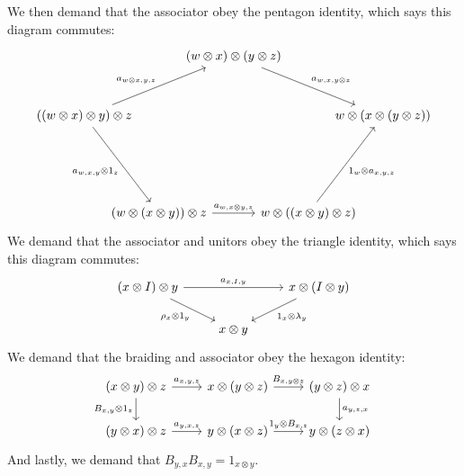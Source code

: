 \documentclass[TFM.tex]{subfiles}
\begin{document}
\begin{defi}
We then demand that the associator obey the pentagon identity, which says this diagram commutes:
\[
\begin{tikzcd}[column sep=-25, row sep=30]
                                                                                                            &                                                                     & (w\otimes x)\otimes (y\otimes z) \arrow[rrd, "{a_{w,x,y\otimes z}}"] &                                                                         &                                \\
((w\otimes x)\otimes y)\otimes z \arrow[rru, "{a_{w\otimes x,y,z}}"] \arrow[rdd, "{a_{w,x,y}\otimes 1_z}"'] &                                                                     &                                                                      &                                                                         & w\otimes(x\otimes(y\otimes z)) \\
                                                                                                            &                                                                     &                                                                      &                                                                         &                                \\
                                                                                                            & (w\otimes (x\otimes y))\otimes z \arrow[rr, "{a_{w,x\otimes y,z}}"] &                                                                      & w\otimes ((x\otimes y)\otimes z) \arrow[ruu, "{1_w\otimes a_{x,y,z}}"'] &                               
\end{tikzcd}
\]
We demand that the associator and unitors obey the triangle identity, which says this diagram commutes:
\[
\begin{tikzcd}
(x\otimes I)\otimes y \arrow[rr, "{a_{x,I,y}}"] \arrow[rd, "\rho_x\otimes 1_y"'] &            & x\otimes (I\otimes y) \arrow[ld, "1_x\otimes\lambda_y"] \\
                                                                                 & x\otimes y &                                                        
\end{tikzcd}
\]
We demand that the braiding and associator obey the hexagon identity:
\[
\begin{tikzcd}
(x\otimes y)\otimes z \arrow[r, "{a_{x,y,z}}"] \arrow[d, "{B_{x,y}\otimes 1_z}"'] & x\otimes (y\otimes z) \arrow[r, "{B_{x,y\otimes z}}"]   & (y\otimes z)\otimes x \arrow[d, "{a_{y,z,x}}"] \\
(y\otimes x)\otimes z \arrow[r, "{a_{y,x,z}}"]                                    & y\otimes (x\otimes z) \arrow[r, "{1_y\otimes B_{x,z}}"] & y\otimes (z\otimes x)                         
\end{tikzcd}
\]
And lastly, we demand that $B_{y,x}B_{x,y}=1_{x\otimes y}$.
\end{defi}
\end{document}
